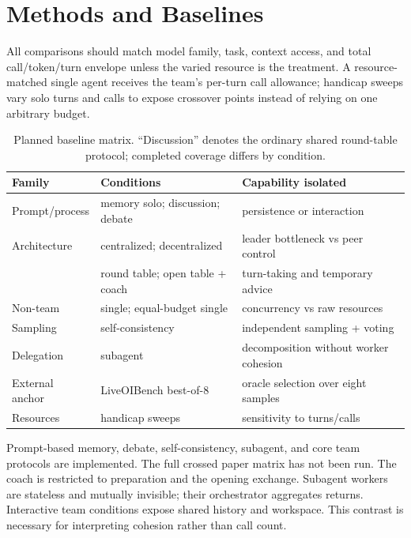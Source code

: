 \section{Methods and Baselines}
All comparisons should match model family, task, context access, and total
call/token/turn envelope unless the varied resource is the treatment. A
resource-matched single agent receives the team's per-turn call allowance;
handicap sweeps vary solo turns and calls to expose crossover points instead
of relying on one arbitrary budget.

\begin{table}[t]
\centering
\small
\begin{tabular}{lll}
\toprule
Family & Conditions & Capability isolated \\
\midrule
Prompt/process & memory solo; discussion; debate & persistence or interaction \\
Architecture & centralized; decentralized & leader bottleneck vs peer control \\
 & round table; open table + coach & turn-taking and temporary advice \\
Non-team & single; equal-budget single & concurrency vs raw resources \\
Sampling & self-consistency & independent sampling + voting \\
Delegation & subagent & decomposition without worker cohesion \\
External anchor & LiveOIBench best-of-8 & oracle selection over eight samples \\
Resources & handicap sweeps & sensitivity to turns/calls \\
\bottomrule
\end{tabular}
\caption{Planned baseline matrix. ``Discussion'' denotes the ordinary shared
round-table protocol; completed coverage differs by condition.}
\end{table}

Prompt-based memory, debate, self-consistency, subagent, and core team
protocols are implemented. The full crossed paper matrix has not been run.
The coach is restricted to preparation and the opening exchange. Subagent
workers are stateless and mutually invisible; their orchestrator aggregates
returns. Interactive team conditions expose shared history and workspace.
This contrast is necessary for interpreting cohesion rather than call count.
